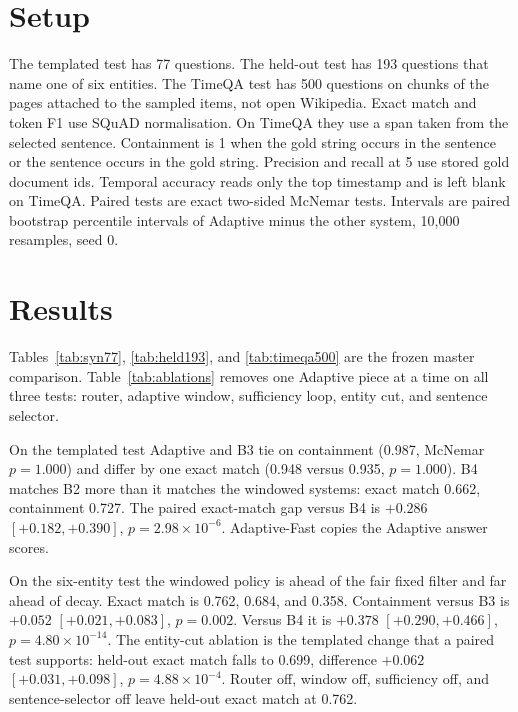 \documentclass[sigconf,anonymous,review]{acmart}
\begin{document}
\section{Setup}

The templated test has 77 questions.
The held-out test has 193 questions that name one of six entities.
The TimeQA test has 500 questions on chunks of the pages attached to the sampled items, not open Wikipedia.
Exact match and token F1 use SQuAD normalisation.
On TimeQA they use a span taken from the selected sentence.
Containment is 1 when the gold string occurs in the sentence or the sentence occurs in the gold string.
Precision and recall at 5 use stored gold document ids.
Temporal accuracy reads only the top timestamp and is left blank on TimeQA.
Paired tests are exact two-sided McNemar tests.
Intervals are paired bootstrap percentile intervals of Adaptive minus the other system, 10{,}000 resamples, seed 0.

\section{Results}

Tables~\ref{tab:syn77}, \ref{tab:held193}, and \ref{tab:timeqa500} are the frozen master comparison.
Table~\ref{tab:ablations} removes one Adaptive piece at a time on all three tests: router, adaptive window, sufficiency loop, entity cut, and sentence selector.



On the templated test Adaptive and B3 tie on containment (0.987, McNemar $p=1.000$) and differ by one exact match (0.948 versus 0.935, $p=1.000$).
B4 matches B2 more than it matches the windowed systems: exact match 0.662, containment 0.727.
The paired exact-match gap versus B4 is $+0.286$ $[+0.182,+0.390]$, $p=2.98\times 10^{-6}$.
Adaptive-Fast copies the Adaptive answer scores.

On the six-entity test the windowed policy is ahead of the fair fixed filter and far ahead of decay.
Exact match is 0.762, 0.684, and 0.358.
Containment versus B3 is $+0.052$ $[+0.021,+0.083]$, $p=0.002$.
Versus B4 it is $+0.378$ $[+0.290,+0.466]$, $p=4.80\times 10^{-14}$.
The entity-cut ablation is the templated change that a paired test supports: held-out exact match falls to 0.699, difference $+0.062$ $[+0.031,+0.098]$, $p=4.88\times 10^{-4}$.
Router off, window off, sufficiency off, and sentence-selector off leave held-out exact match at 0.762.
\end{document}
